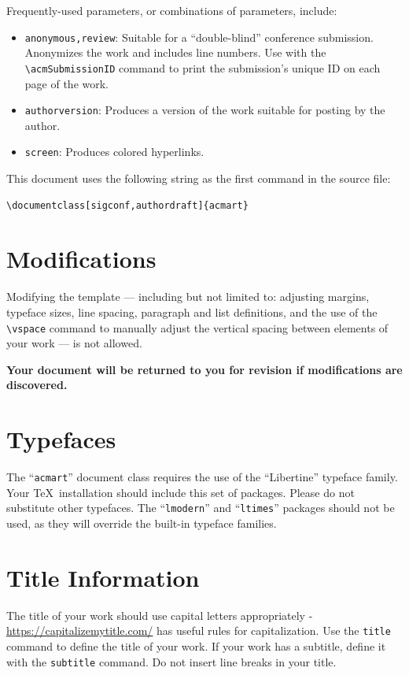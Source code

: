 Frequently-used parameters, or combinations of parameters, include:
\begin{itemize}
	\item {\verb|anonymous,review|}: Suitable for a ``double-blind''
	      conference submission. Anonymizes the work and includes line
	      numbers. Use with the \verb|\acmSubmissionID| command to print the
	      submission's unique ID on each page of the work.
	      \item{\verb|authorversion|}: Produces a version of the work suitable
	      for posting by the author.
	      \item{\verb|screen|}: Produces colored hyperlinks.
\end{itemize}

This document uses the following string as the first command in the
source file:
\begin{verbatim}
\documentclass[sigconf,authordraft]{acmart}
\end{verbatim}

\section{Modifications}

Modifying the template --- including but not limited to: adjusting
margins, typeface sizes, line spacing, paragraph and list definitions,
and the use of the \verb|\vspace| command to manually adjust the
vertical spacing between elements of your work --- is not allowed.

	{\bfseries Your document will be returned to you for revision if
		modifications are discovered.}

\section{Typefaces}

The ``\verb|acmart|'' document class requires the use of the
``Libertine'' typeface family. Your \TeX\ installation should include
this set of packages. Please do not substitute other typefaces. The
``\verb|lmodern|'' and ``\verb|ltimes|'' packages should not be used,
as they will override the built-in typeface families.

\section{Title Information}

The title of your work should use capital letters appropriately -
\url{https://capitalizemytitle.com/} has useful rules for
capitalization. Use the {\verb|title|} command to define the title of
your work. If your work has a subtitle, define it with the
	{\verb|subtitle|} command.  Do not insert line breaks in your title.

